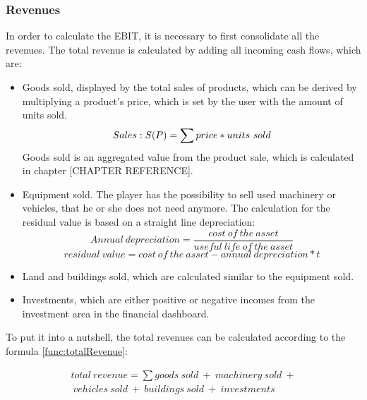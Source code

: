 \subsubsection{Revenues}
In order to calculate the EBIT, it is necessary to first consolidate all the revenues. The total revenue is calculated by adding all incoming cash flows, which are:
\begin{itemize}
    \item Goods sold, displayed by the total sales of products, which can be derived by multiplying a product’s price, which is set by the user with the amount of units sold. %
    \begin{equation}
        Sales: S(P) = \sum price\index{Product} * units~sold
    \end{equation}
    Goods sold is an aggregated value from the product sale, which is calculated in chapter [CHAPTER REFERENCE].
    \item Equipment sold. The player has the possibility to sell used machinery or vehicles, that he or she does not need anymore. The calculation for the residual value is based on a straight line depreciation:
     \begin{equation}
     Annual \ depreciation = {\dfrac{cost \ of \ the \ asset}{useful \ life \ of \ the \ asset}}
    \end{equation}
     \begin{equation}
     residual \ value = {{cost \ of \ the \ asset} - {annual \ depreciation * t }}    
     \end{equation}
    
    \item Land and buildings sold, which are calculated similar to the equipment sold. %
  
    \item Investments, which are either positive or negative incomes from the investment area in the financial dashboard. %
\end{itemize}

To put it into a nutshell, the total revenues can be calculated according to the formula \ref{func:totalRevenue}:

\begin{equation}
\label{func:totalRevenue}
\begin{split}
    total \ revenue = \sum goods \ sold \ + \ machinery \ sold \ + \\\ vehicles \ sold \  + \ buildings \ sold \ + \ investments   
\end{split}
\end{equation}

